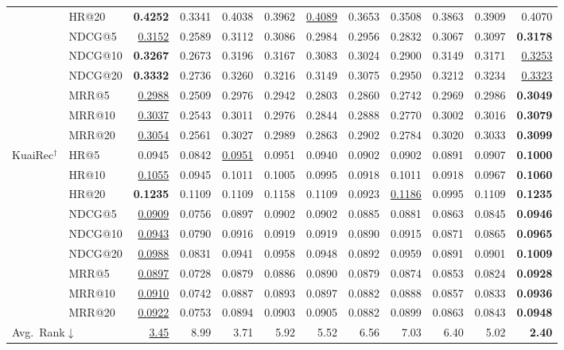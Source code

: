 \documentclass[sigconf,review,anonymous]{acmart}
\newcommand{\tblbest}[1]{\textbf{#1}}
\newcommand{\tblsecond}[1]{\underline{#1}}
\begin{document}
\begin{table}[t]
{\begin{tabular}{llrrrrrrrrrr}
      & HR@20   & \tblbest{0.4252} & 0.3341 & 0.4038 & 0.3962 & \tblsecond{0.4089} & 0.3653 & 0.3508 & 0.3863 & 0.3909 & 0.4070 \\
      & NDCG@5  & \tblsecond{0.3152} & 0.2589 & 0.3112 & 0.3086 & 0.2984 & 0.2956 & 0.2832 & 0.3067 & 0.3097 & \tblbest{0.3178} \\
      & NDCG@10 & \tblbest{0.3267} & 0.2673 & 0.3196 & 0.3167 & 0.3083 & 0.3024 & 0.2900 & 0.3149 & 0.3171 & \tblsecond{0.3253} \\
      & NDCG@20 & \tblbest{0.3332} & 0.2736 & 0.3260 & 0.3216 & 0.3149 & 0.3075 & 0.2950 & 0.3212 & 0.3234 & \tblsecond{0.3323} \\
      & MRR@5   & \tblsecond{0.2988} & 0.2509 & 0.2976 & 0.2942 & 0.2803 & 0.2860 & 0.2742 & 0.2969 & 0.2986 & \tblbest{0.3049} \\
      & MRR@10  & \tblsecond{0.3037} & 0.2543 & 0.3011 & 0.2976 & 0.2844 & 0.2888 & 0.2770 & 0.3002 & 0.3016 & \tblbest{0.3079} \\
      & MRR@20  & \tblsecond{0.3054} & 0.2561 & 0.3027 & 0.2989 & 0.2863 & 0.2902 & 0.2784 & 0.3020 & 0.3033 & \tblbest{0.3099} \\
    \midrule
    \multirow{9}{*}{KuaiRec$^\dagger$}
      & HR@5    & 0.0945 & 0.0842 & \tblsecond{0.0951} & 0.0951 & 0.0940 & 0.0902 & 0.0902 & 0.0891 & 0.0907 & \tblbest{0.1000} \\
      & HR@10   & \tblsecond{0.1055} & 0.0945 & 0.1011 & 0.1005 & 0.0995 & 0.0918 & 0.1011 & 0.0918 & 0.0967 & \tblbest{0.1060} \\
      & HR@20   & \tblbest{0.1235} & 0.1109 & 0.1109 & 0.1158 & 0.1109 & 0.0923 & \tblsecond{0.1186} & 0.0995 & 0.1109 & \tblbest{0.1235} \\
      & NDCG@5  & \tblsecond{0.0909} & 0.0756 & 0.0897 & 0.0902 & 0.0902 & 0.0885 & 0.0881 & 0.0863 & 0.0845 & \tblbest{0.0946} \\
      & NDCG@10 & \tblsecond{0.0943} & 0.0790 & 0.0916 & 0.0919 & 0.0919 & 0.0890 & 0.0915 & 0.0871 & 0.0865 & \tblbest{0.0965} \\
      & NDCG@20 & \tblsecond{0.0988} & 0.0831 & 0.0941 & 0.0958 & 0.0948 & 0.0892 & 0.0959 & 0.0891 & 0.0901 & \tblbest{0.1009} \\
      & MRR@5   & \tblsecond{0.0897} & 0.0728 & 0.0879 & 0.0886 & 0.0890 & 0.0879 & 0.0874 & 0.0853 & 0.0824 & \tblbest{0.0928} \\
      & MRR@10  & \tblsecond{0.0910} & 0.0742 & 0.0887 & 0.0893 & 0.0897 & 0.0882 & 0.0888 & 0.0857 & 0.0833 & \tblbest{0.0936} \\
      & MRR@20  & \tblsecond{0.0922} & 0.0753 & 0.0894 & 0.0903 & 0.0905 & 0.0882 & 0.0899 & 0.0863 & 0.0843 & \tblbest{0.0948} \\
    \midrule
    \multicolumn{2}{l}{Avg.~Rank$\downarrow$} & \tblsecond{3.45} & 8.99 & 3.71 & 5.92 & 5.52 & 6.56 & 7.03 & 6.40 & 5.02 & \tblbest{2.40} \\
    \bottomrule
  \end{tabular}}
\end{table}
\end{document}
